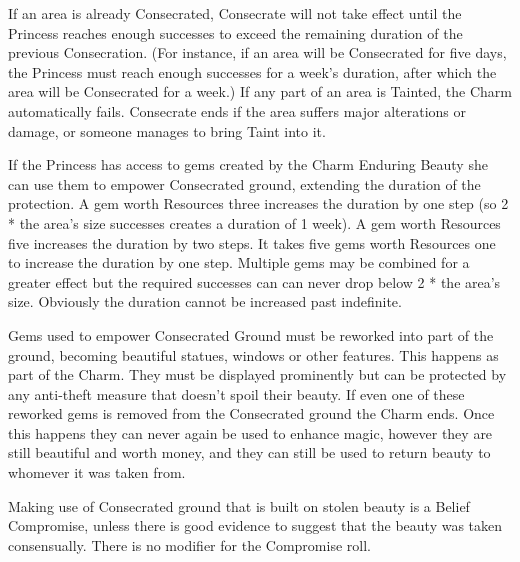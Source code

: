 \noindent  If an area is already Consecrated, Consecrate will not take effect until the Princess reaches enough successes to exceed the remaining duration of the previous Consecration. (For instance, if an area will be Consecrated for five days, the Princess must reach enough successes for a week's duration, after which the area will be Consecrated for a week.) If any part of an area is Tainted, the Charm automatically fails. Consecrate ends if the area suffers major alterations or damage, or someone manages to bring Taint into it.

If the Princess has access to gems created by the Charm Enduring Beauty she can use them to empower Consecrated ground, extending the duration of the protection. A gem worth Resources three increases the duration by one step (so 2 * the area's size successes creates a duration of 1 week). A gem worth Resources five increases the duration by two steps. It takes five gems worth Resources one to increase the duration by one step. Multiple gems may be combined for a greater effect but the required successes can can never drop below 2 * the area's size. Obviously the duration cannot be increased past indefinite. 

Gems used to empower Consecrated Ground must be reworked into part of the ground, becoming beautiful statues, windows or other features. This happens as part of the Charm. They must be displayed prominently but can be protected by any anti-theft measure that doesn’t spoil their beauty. If even one of these reworked gems is removed from the Consecrated ground the Charm ends. Once this happens they can never again be used to enhance magic, however they are still beautiful and worth money, and they can still be used to return beauty to whomever it was taken from.

Making use of Consecrated ground that is built on stolen beauty is a Belief Compromise, unless there is good evidence to suggest that the beauty was taken consensually. There is no modifier for the Compromise roll.

